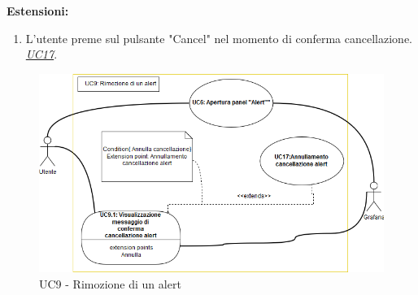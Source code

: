                     \textbf{Estensioni:} 
                    \begin{enumerate}
                            \item L'utente preme sul pulsante "Cancel" nel momento di conferma cancellazione. \underline{\textit{UC17}}.
                        \end{enumerate}
                        
                        \begin{figure}[!htbp]
                    	\centering
                    	\includegraphics[width=\textwidth]{UC9.png}
                    	\caption{UC9 - Rimozione di un alert}
                    	\label{uc9}
                    \end{figure}   
                        
